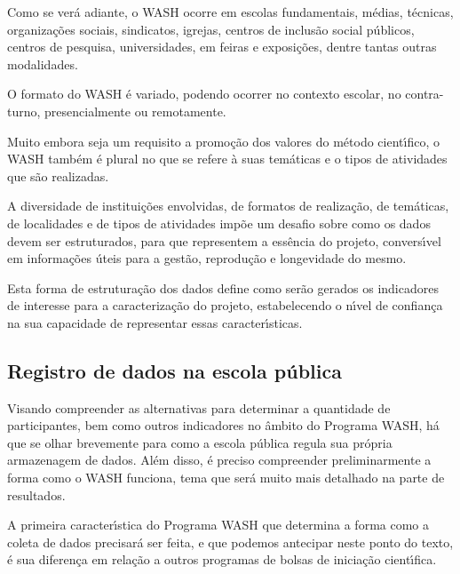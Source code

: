 \documentclass[
12pt,		%
openright,	%
twoside,  %
a4paper,			%
chapter=TITLE,		%
english,			%
french,				%
spanish,			%
brazil				%
]{USPSC-classe/USPSC}
\begin{document}
Como se ver\'a adiante, o WASH ocorre  em escolas fundamentais, m\'edias, t\'ecnicas, organiza\c{c}\~oes sociais, sindicatos, igrejas, centros de inclus\~ao social p\'ublicos, centros de pesquisa, universidades, em feiras e exposi\c{c}\~oes, dentre tantas outras modalidades.




O formato do WASH \'e variado, podendo ocorrer no contexto escolar, no contra-turno, presencialmente ou remotamente.




Muito embora seja um requisito a promo\c{c}\~ao dos valores do m\'etodo cient\'{\i}fico, o WASH tamb\'em \'e plural no que se refere \`a suas tem\'aticas e o tipos de atividades que s\~ao realizadas.




A diversidade de institui\c{c}\~oes envolvidas, de formatos de realiza\c{c}\~ao, de tem\'aticas, de localidades e de tipos de atividades imp\~oe um desafio sobre como os dados devem ser estruturados, para que representem a ess\^encia do projeto, convers\'{\i}vel em informa\c{c}\~oes \'uteis para a gest\~ao, reprodu\c{c}\~ao e longevidade do mesmo.




Esta forma de estrutura\c{c}\~ao dos dados define como ser\~ao gerados os indicadores de interesse para a caracteriza\c{c}\~ao do projeto, estabelecendo o n\'{\i}vel de confian\c{c}a na sua capacidade de representar essas caracter\'{\i}sticas.




\subsection[Registro de dados na escola p\'ublica]{Registro de dados na escola p\'ublica}\label{Registro de dados na escola p\'ublica}
Visando compreender as alternativas para determinar a quantidade de participantes, bem como outros indicadores no \^ambito do Programa WASH, h\'a que se olhar brevemente para como a escola p\'ublica regula sua pr\'opria armazenagem de dados. Al\'em disso, \'e preciso compreender preliminarmente a forma como o WASH funciona, tema que ser\'a muito mais detalhado na parte de resultados.




A primeira caracter\'{\i}stica do Programa WASH que determina a forma como a coleta de dados precisar\'a ser feita, e que podemos antecipar neste ponto do texto, \'e sua diferen\c{c}a em rela\c{c}\~ao a outros programas de bolsas de inicia\c{c}\~ao cient\'{\i}fica.
\end{document}
